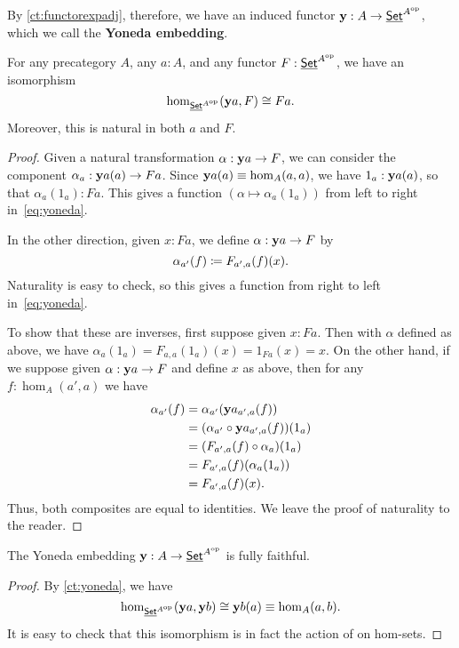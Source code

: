 By \autoref{ct:functorexpadj}, therefore, we have an induced functor $\mathbf{y}:A\to \underline{\mathsf{Set}}^{A^{\textrm{op}}}$, which we call the \textbf{Yoneda embedding}.

\begin{thm}\label{ct:yoneda}
  For any precategory $A$, any $a:A$, and any functor $F:\underline{\mathsf{Set}}^{A^{\textrm{op}}}$, we have an isomorphism
  \begin{equation}\label{eq:yoneda}
    \hom_{\underline{\mathsf{Set}}^{A^{\textrm{op}}}}(\mathbf{y} a, F) \cong Fa.
  \end{equation}
  Moreover, this is natural in both $a$ and $F$.
\end{thm}
\begin{proof}
  Given a natural transformation $\alpha:\mathbf{y} a \to F$, we can consider the component $\alpha_a : \mathbf{y} a(a) \to F a$.
  Since $\mathbf{y} a(a)\equiv \hom_A(a,a)$, we have $1_a : \mathbf{y} a(a)$, so that $\alpha_a(1_a) : F a$.
  This gives a function $(\alpha \mapsto \alpha_a(1_a))$ from left to right in~\eqref{eq:yoneda}.

  In the other direction, given $x:F a$, we define $\alpha:\mathbf{y} a \to F$ by
  \[\alpha_{a'}(f) \coloneqq F_{a',a}(f)(x). \]
  Naturality is easy to check, so this gives a function from right to left in~\eqref{eq:yoneda}.

  To show that these are inverses, first suppose given $x:F a$.
  Then with $\alpha$ defined as above, we have $\alpha_a(1_a) = F_{a,a}(1_a)(x) = 1_{F a}(x) = x$.
  On the other hand, if we suppose given $\alpha:\mathbf{y} a \to F$ and define $x$ as above, then for any $f:\hom_A(a',a)$ we have
  \begin{align*}
    \alpha_{a'}(f)
    &= \alpha_{a'} (\mathbf{y} a_{a',a}(f))\\
    &= (\alpha_{a'}\circ \mathbf{y} a_{a',a}(f))(1_a)\\
    &= (F_{a',a}(f)\circ \alpha_a)(1_a)\\
    &= F_{a',a}(f)(\alpha_a(1_a))\\
    &= F_{a',a}(f)(x).
  \end{align*}
  Thus, both composites are equal to identities.
  We leave the proof of naturality to the reader.
\end{proof}

\begin{cor}\label{ct:yoneda-embedding}
  The Yoneda embedding $\mathbf{y} :A\to \underline{\mathsf{Set}}^{A^{\textrm{op}}}$ is fully faithful.
\end{cor}
\begin{proof}
  By \autoref{ct:yoneda}, we have
  \[ \hom_{\underline{\mathsf{Set}}^{A^{\textrm{op}}}}(\mathbf{y} a, \mathbf{y} b) \cong \mathbf{y} b(a) \equiv \hom_A(a,b). \]
  It is easy to check that this isomorphism is in fact the action of \y on hom-sets.
\end{proof}

